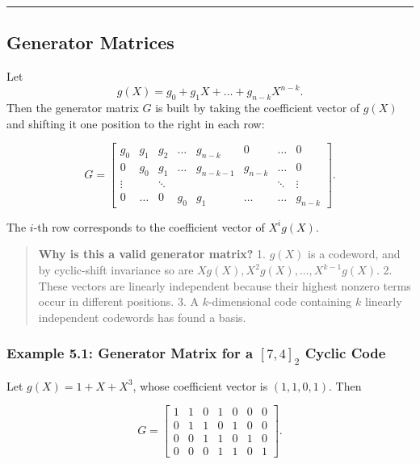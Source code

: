 \documentclass[
]{article}
\begin{document}
\begin{center}\rule{0.5\linewidth}{0.5pt}\end{center}

\subsection{Generator Matrices}\label{how-do-we-construct-a-generator-matrix}

Let \[g(X)=g_0+g_1X+\dots+g_{n-k}X^{n-k}.\] Then the generator matrix
\(G\) is built by taking the coefficient vector of \(g(X)\) and shifting
it one position to the right in each row:

\[G = \begin{bmatrix}
g_0 & g_1 & g_2 & \dots & g_{n-k} & 0 & \dots & 0 \\
0 & g_0 & g_1 & \dots & g_{n-k-1} & g_{n-k} & \dots & 0 \\
\vdots & & \ddots & & & & \ddots & \vdots \\
0 & \dots & 0 & g_0 & g_1 & \dots & \dots & g_{n-k}
\end{bmatrix}.\]

The \(i\)-th row corresponds to the coefficient vector of \(X^i g(X)\).

\begin{quote}
\textbf{Why is this a valid generator matrix?} 1. \(g(X)\) is a
codeword, and by cyclic-shift invariance so are
\(Xg(X),X^2g(X),\dots,X^{k-1}g(X)\). 2. These vectors are linearly
independent because their highest nonzero terms occur in different
positions. 3. A \(k\)-dimensional code containing \(k\) linearly
independent codewords has found a basis.
\end{quote}

\subsubsection{\texorpdfstring{Example 5.1: Generator Matrix for a
\([7,4]_2\) Cyclic
Code}{Example 5.1: Generator Matrix for a {[}7,4{]}\_2 Cyclic Code}}\label{example-5.1-generator-matrix-for-a-74_2-cyclic-code}

Let \(g(X)=1+X+X^3\), whose coefficient vector is \((1,1,0,1)\). Then

\[G = \begin{bmatrix}
1 & 1 & 0 & 1 & 0 & 0 & 0 \\
0 & 1 & 1 & 0 & 1 & 0 & 0 \\
0 & 0 & 1 & 1 & 0 & 1 & 0 \\
0 & 0 & 0 & 1 & 1 & 0 & 1
\end{bmatrix}.\]
\end{document}
